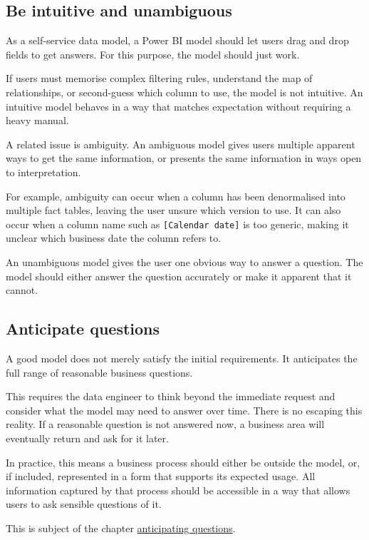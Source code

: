 \documentclass[10pt,openany,10pt]{book}
\begin{document}
\subsection{Be intuitive and
unambiguous}\label{be-intuitive-and-unambiguous}

As a self-service data model, a Power BI model should let users drag and
drop fields to get answers. For this purpose, the model should just
work.

If users must memorise complex filtering rules, understand the map of
relationships, or second-guess which column to use, the model is not
intuitive. An intuitive model behaves in a way that matches expectation
without requiring a heavy manual.

A related issue is ambiguity. An ambiguous model gives users multiple
apparent ways to get the same information, or presents the same
information in ways open to interpretation.

For example, ambiguity can occur when a column has been denormalised
into multiple fact tables, leaving the user unsure which version to use.
It can also occur when a column name such as
\texttt{{[}Calendar\ date{]}} is too generic, making it unclear which
business date the column refers to.

An unambiguous model gives the user one obvious way to answer a
question. The model should either answer the question accurately or make
it apparent that it cannot.

\subsection{Anticipate questions}\label{anticipate-questions}

A good model does not merely satisfy the initial requirements. It
anticipates the full range of reasonable business questions.

This requires the data engineer to think beyond the immediate request
and consider what the model may need to answer over time. There is no
escaping this reality. If a reasonable question is not answered now, a
business area will eventually return and ask for it later.

In practice, this means a business process should either be outside the
model, or, if included, represented in a form that supports its expected
usage. All information captured by that process should be accessible in
a way that allows users to ask sensible questions of it.

This is subject of the chapter
\hyperref[docs-presenting-insights-anticipating-questions]{anticipating
questions}.
\end{document}
